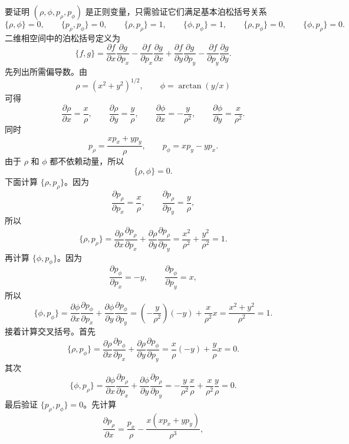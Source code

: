 \begin{solution}[正则变换例子]
\answer
要证明 \((\rho,\phi,p_\rho,p_\phi)\) 是正则变量，只需验证它们满足基本泊松括号关系
\[
\{\rho,\phi\}=0,\qquad \{p_\rho,p_\phi\}=0,\qquad
\{\rho,p_\rho\}=1,\qquad \{\phi,p_\phi\}=1,\qquad
\{\rho,p_\phi\}=0,\qquad \{\phi,p_\rho\}=0.
\]
二维相空间中的泊松括号定义为
\[
\{f,g\}=\frac{\partial f}{\partial x}\frac{\partial g}{\partial p_x}-\frac{\partial f}{\partial p_x}\frac{\partial g}{\partial x}+\frac{\partial f}{\partial y}\frac{\partial g}{\partial p_y}-\frac{\partial f}{\partial p_y}\frac{\partial g}{\partial y}.
\]
先列出所需偏导数。由
\[
\rho=(x^2+y^2)^{1/2},\qquad \phi=\arctan(y/x)
\]
可得
\[
\frac{\partial \rho}{\partial x}=\frac{x}{\rho},\qquad
\frac{\partial \rho}{\partial y}=\frac{y}{\rho},\qquad
\frac{\partial \phi}{\partial x}=-\frac{y}{\rho^2},\qquad
\frac{\partial \phi}{\partial y}=\frac{x}{\rho^2}.
\]
同时
\[
p_\rho=\frac{xp_x+yp_y}{\rho},\qquad p_\phi=xp_y-yp_x.
\]
由于 \(\rho\) 和 \(\phi\) 都不依赖动量，所以
\[
\{\rho,\phi\}=0.
\]
下面计算 \(\{\rho,p_\rho\}\)。因为
\[
\frac{\partial p_\rho}{\partial p_x}=\frac{x}{\rho},\qquad
\frac{\partial p_\rho}{\partial p_y}=\frac{y}{\rho},
\]
所以
\[
\{\rho,p_\rho\}
=
\frac{\partial \rho}{\partial x}\frac{\partial p_\rho}{\partial p_x}
+
\frac{\partial \rho}{\partial y}\frac{\partial p_\rho}{\partial p_y}
=
\frac{x^2}{\rho^2}+\frac{y^2}{\rho^2}=1.
\]
再计算 \(\{\phi,p_\phi\}\)。因为
\[
\frac{\partial p_\phi}{\partial p_x}=-y,\qquad
\frac{\partial p_\phi}{\partial p_y}=x,
\]
所以
\[
\{\phi,p_\phi\}
=
\frac{\partial \phi}{\partial x}\frac{\partial p_\phi}{\partial p_x}
+
\frac{\partial \phi}{\partial y}\frac{\partial p_\phi}{\partial p_y}
=
\left(-\frac{y}{\rho^2}\right)(-y)
+
\frac{x}{\rho^2}x
=
\frac{x^2+y^2}{\rho^2}=1.
\]
接着计算交叉括号。首先
\[
\{\rho,p_\phi\}
=
\frac{\partial \rho}{\partial x}\frac{\partial p_\phi}{\partial p_x}
+
\frac{\partial \rho}{\partial y}\frac{\partial p_\phi}{\partial p_y}
=
\frac{x}{\rho}(-y)+\frac{y}{\rho}x=0.
\]
其次
\[
\{\phi,p_\rho\}
=
\frac{\partial \phi}{\partial x}\frac{\partial p_\rho}{\partial p_x}
+
\frac{\partial \phi}{\partial y}\frac{\partial p_\rho}{\partial p_y}
=
-\frac{y}{\rho^2}\frac{x}{\rho}
+
\frac{x}{\rho^2}\frac{y}{\rho}
=0.
\]
最后验证 \(\{p_\rho,p_\phi\}=0\)。先计算
\[
\frac{\partial p_\rho}{\partial x}
=
\frac{p_x}{\rho}-\frac{x(xp_x+yp_y)}{\rho^3},
\]
\end{solution}
